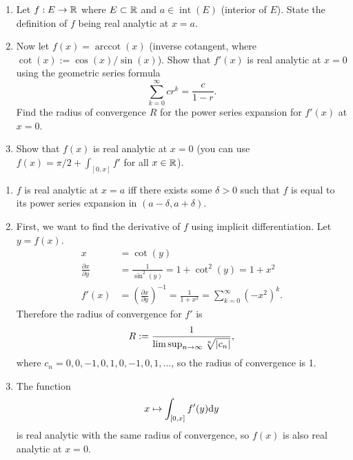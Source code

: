 \documentclass{article}
\begin{document}
\bigskip
\begin{prob}
    \begin{enumerate}[label=(\alph*)]
        \item Let $f: E \rightarrow \mathbb{R}$ where $E \subset \mathbb{R}$ and $a \in \operatorname{int}(E)$ (interior of $E$). State the definition of $f$ being real analytic at $x=a$.
        \item Now let $f(x) = \operatorname{arccot}(x)$ (inverse cotangent, where $\cot(x) := \cos(x)/\sin(x)$). Show that $f'(x)$ is real analytic at $x=0$ using the geometric series formula
            \[ \sum_{k=0}^\infty cr^k = \frac{c}{1-r}. \]
            Find the radius of convergence $R$ for the power series expansion for $f'(x)$ at $x=0$.
        \item Show that $f(x)$ is real analytic at $x=0$ (you can use $f(x) = \pi/2 + \int_{[0,x]} f'$ for all $x \in \mathbb{R}$).
    \end{enumerate}
\end{prob}
\begin{enumerate}[label=(\alph*)]
    \item $f$ is real analytic at $x=a$ iff there exists some $\delta > 0$ such that $f$ is equal to its power series expansion in $(a-\delta,a+\delta)$.
    \item First, we want to find the derivative of $f$ using implicit differentiation. Let $y=f(x)$.
        \begin{align*}
            x &= \cot(y) \\
            \frac{\partial x}{\partial y} &= \frac{1}{\sin^2(y)} = 1 + \cot^2(y) = 1+x^2 \\
            f'(x) &= \left( \frac{\partial x}{\partial y} \right)^{-1} = \frac{1}{1+x^2} = \sum_{k=0}^\infty (-x^2)^k.
        \end{align*}
        Therefore the radius of convergence for $f'$ is
        \[ R := \frac{1}{\limsup_{n \rightarrow \infty} \sqrt[n]{\left\lvert c_n \right\rvert}}, \]
        where $c_n = 0, 0, -1, 0, 1, 0, -1, 0, 1, \dots$, so the radius of convergence is 1.
    \item The function
        \[ x \mapsto \int_{[0,x]} f'(y) \mathrm{d} y \]
        is real analytic with the same radius of convergence, so $f(x)$ is also real analytic at $x=0$.
\end{enumerate}
\end{document}
